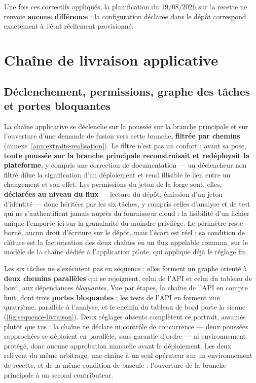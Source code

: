 Une fois ces correctifs appliqués, la planification du 19/08/2026 sur la recette ne renvoie
\textbf{aucune différence} : la configuration déclarée dans le dépôt correspond exactement à l'état
réellement provisionné.

\section{Chaîne de livraison applicative}
\label{sec:chaine-livraison}

\subsection{Déclenchement, permissions, graphe des tâches et portes bloquantes}

La chaîne applicative se déclenche sur la poussée sur la branche principale et sur l'ouverture
d'une demande de fusion vers cette branche, \textbf{filtrée par chemins}
(annexe~\ref{ann:extraits-realisation}). Le filtre n'est pas un confort : avant sa pose,
\textbf{toute poussée sur la branche principale reconstruisait et redéployait la plateforme}, y
compris une correction de documentation --- un déclencheur non filtré dilue la signification d'un
déploiement et rend illisible le lien entre un changement et son effet. Les permissions du jeton de
la forge sont, elles, \textbf{déclarées au niveau du flux} --- lecture du dépôt, émission d'un
jeton d'identité --- donc héritées par les six tâches, y compris celles d'analyse et de test qui ne
s'authentifient jamais auprès du fournisseur cloud : la lisibilité d'un fichier unique l'emporte
ici sur la granularité du moindre privilège. Le périmètre reste borné, aucun droit d'écriture sur
le dépôt, mais l'écart est réel ; sa condition de clôture est la factorisation des deux chaînes en
un flux appelable commun, sur le modèle de la chaîne dédiée à l'application pilote, qui applique
déjà le réglage fin.

Les six tâches ne s'exécutent pas en séquence : elles forment un graphe orienté à \textbf{deux
chemins parallèles} qui se rejoignent, celui de l'API et celui du tableau de bord, aux dépendances
\emph{bloquantes}. Vue par étapes, la chaîne de l'API en compte huit, dont trois \textbf{portes
bloquantes} \cite{owasp_cicd_top10} ; les tests de l'API en forment une quatrième, parallèle à
l'analyse, et le chemin du tableau de bord porte la sienne
(\cref{fig:sequence-livraison}). Deux réglages absents complètent ce portrait, assumés plutôt que
tus : la chaîne ne déclare ni contrôle de concurrence --- deux poussées rapprochées se déploient en
parallèle, sans garantie d'ordre --- ni environnement protégé, donc aucune approbation manuelle
avant le déploiement. Les deux relèvent du même arbitrage, une chaîne à un seul opérateur sur un
environnement de recette, et de la même condition de bascule : l'ouverture de la branche principale
à un second contributeur.

